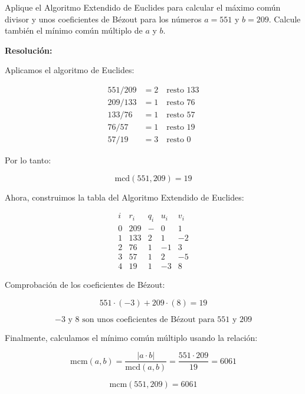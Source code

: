 \documentclass[a4paper,12pt]{article}
\begin{document}
\begin{ejercicio}[title=Ejercicio 5]
Aplique el Algoritmo Extendido de Euclides para calcular el máximo común divisor y unos coeficientes de Bézout para los números $a = 551$ y $b = 209$. Calcule también el mínimo común múltiplo de $a$ y $b$.

\tcblower
\textbf{Resolución:}

Aplicamos el algoritmo de Euclides:

\[
\begin{aligned}
551 / 209 &= 2 \quad \text{resto } 133 \\
209 / 133 &= 1 \quad \text{resto } 76 \\
133 / 76  &= 1 \quad \text{resto } 57 \\
76 / 57   &= 1 \quad \text{resto } \boxed{19} \\
57 / 19   &= 3 \quad \text{resto } 0
\end{aligned}
\]

Por lo tanto:

\[
\boxed{\text{mcd}(551,209) = 19}
\]

Ahora, construimos la tabla del Algoritmo Extendido de Euclides:

\[
\begin{array}{c|c|c|c|c}
i & r_i & q_i & u_i & v_i \\
\hline
0 & 209 & - & 0 & 1 \\
1 & 133 & 2 & 1 & -2 \\
2 & 76  & 1 & -1 & 3 \\
3 & 57  & 1 & 2 & -5 \\
4 & \boxed{19} & 1 & -3 & 8
\end{array}
\]

Comprobación de los coeficientes de Bézout:

\[
551 \cdot (-3) + 209 \cdot (8) = 19
\]

\[
\boxed{-3 \text{ y } 8 \text{ son unos coeficientes de Bézout para } 551 \text{ y } 209}
\]

Finalmente, calculamos el mínimo común múltiplo usando la relación:

\[
\text{mcm}(a,b) = \frac{|a \cdot b|}{\text{mcd}(a,b)} = \frac{551 \cdot 209}{19} = 6061
\]

\[
\boxed{\text{mcm}(551,209) = 6061}
\]

\end{ejercicio}
\end{document}
